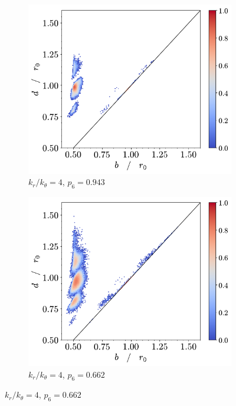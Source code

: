 \begin{figure}[tbp]
	\begin{subfigure}[b]{0.40\textwidth}
         \centering
         \includegraphics[width=\textwidth]{./figures/ph/t_k4_399_bs_pd.pdf}
         \caption{$k_r/k_\theta=4$, $p_6=0.943$}%
         \label{fig:bspde}
     \end{subfigure}
     \hspace{2cm}
        \begin{subfigure}[b]{0.40\textwidth}
         \centering
         \includegraphics[width=\textwidth]{./figures/ph/t_k4_257_bs_pd.pdf}
         \caption{$k_r/k_\theta=4$, $p_6=0.662$}%
         \label{fig:bspdf}
     \end{subfigure}
     

\end{figure}
